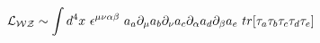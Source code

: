 \begin{equation}
{\cal{L}_{WZ}}\sim \int d^4x~\epsilon^{\mu\nu\alpha\beta}~a_a \partial_\mu a_b \partial_\nu a_c \partial_\alpha a_d \partial_\beta a_e~tr[\tau_a \tau_b\tau_c \tau_d \tau_e]
\end{equation}

